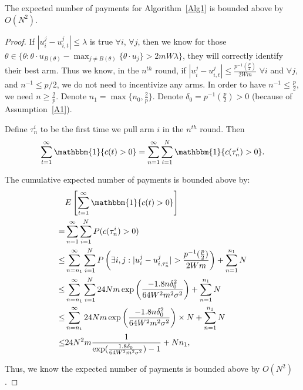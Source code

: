                   \begin{lemma}
                  The expected number of payments for Algorithm~\ref{Alg1} is bounded above by $O(N^2)$.
                  \label{lemma:numP}
                  \end{lemma}

                  \begin{proof}
                  If $|u_{i}^{j}-u_{i,t}^{j}|\leq \lambda$ is true $\forall i$, $\forall j$, then we know for those $\theta\in \{\theta:\theta\cdot u_{B(\theta)}-\max_{j\neq B(\theta)}\{\theta \cdot u_{j}\}> 2mW\lambda\}$, they will correctly identify their best arm. Thus we know, in the $n^{th}$ round, if $|u_{i}^{j}-u_{i,t}^{j}|\leq \frac{p^{-1}(\frac{p}{2})}{2Wm}$ $\forall i$ and $\forall j$, and $n^{-1}\leq p/2$, we do not need to incentivize any arms. In order to have $n^{-1}\leq \frac{p}{2}$, we need $n\geq \frac{2}{p}$. Denote $n_1=\max\{n_{0}, \frac{2}{p}\}$. Denote $\delta_{0}=p^{-1}(\frac{p}{2})>0$ (because of Assumption~\ref{A1}).

                  Define $\tau_{n}^{i}$ to be the first time we pull arm $i$ in the $n^{th}$ round. Then
                  \begin{align}
                  \sum_{t=1}^{\infty}\mathbbm{1}\{c(t)>0\} =\sum_{n=1}^{\infty}\sum_{i=1}^{N}\mathbbm{1}\{c(\tau_{n}^{i})>0\}. \nonumber
                  \end{align}

                  The cumulative expected number of payments is bounded above by:
                  \begin{align}
                  &E\left[\sum_{t=1}^{\infty}\mathbbm{1}\{c(t)>0\}\right] \nonumber \\
                    =&\sum_{n=1}^{\infty}\sum_{i=1}^{N}P(c(\tau_{n}^{i})>0) \nonumber \\
                    \leq &\sum_{n=n_{1}}^{\infty}\sum_{i=1}^{N}P\left(\exists i,j:|u_{i}^{j}-u_{i,\tau_{n}^{i}}^{j}|>\frac{p^{-1}(\frac{p}{2})}{2Wm}\right)+\sum_{n=1}^{n_1}N \nonumber \\
                    \leq &\sum_{n=n_{1}}^{\infty}\sum_{i=1}^{N}24Nm \exp\left(\frac{-1.8 n\delta_{0}^2}{64W^2 m^2\sigma^2}\right) +\sum_{n=1}^{n_1}N \nonumber \\
                    \leq & \sum_{n=n_{1}}^{\infty}24Nm \exp\left(\frac{-1.8 n\delta_{0}^2}{64W^2 m^2\sigma^2}\right)\times N+\sum_{n=1}^{n_1}N \nonumber  \\
                    \leq&24N^2 m \frac{1}{\exp(\frac{1.8\delta_{0}}{64W^2 m^2\sigma^2})-1} + Nn_1, \nonumber
                    \end{align}

                    Thus, we know the expected number of payments is bounded above by $O(N^2)$.

                    \end{proof}


